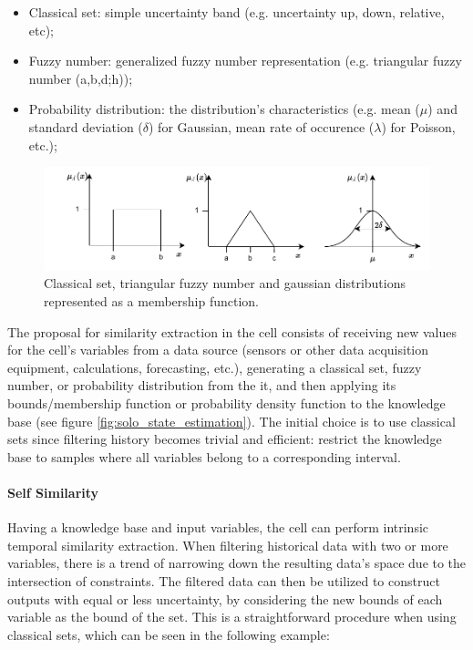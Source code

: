 \begin{itemize}
    \item Classical set: simple uncertainty band (e.g. uncertainty up, down, relative, etc);
    \item Fuzzy number: generalized fuzzy number representation \cite{Zhang2019} (e.g. triangular fuzzy number (a,b,d;h));
    \item Probability distribution: the distribution's characteristics (e.g. mean ($\mu$) and standard deviation ($\delta$) for Gaussian, mean rate of occurence ($\lambda$) for Poisson, etc.);
\end{itemize}

\begin{figure}[h!]
    \centering
    \includegraphics[width=15cm]{figures/chapter4/cell/classic_fuzzy_gaussian.pdf}
    \caption{Classical set, triangular fuzzy number and gaussian distributions represented as a membership function.}
    \label{fig:classicfuzzygaussian}
\end{figure}

The proposal for similarity extraction in the cell consists of receiving new values for the cell's variables from a data source (sensors or other data acquisition equipment, calculations, forecasting, etc.), generating a classical set, fuzzy number, or probability distribution from the it, and then applying its bounds/membership function or probability density function to the knowledge base (see figure \ref{fig:solo_state_estimation}). The initial choice is to use classical sets since filtering history becomes trivial and efficient: restrict the knowledge base to samples where all variables belong to a corresponding interval.

\paragraph{Self Similarity}

Having a knowledge base and input variables, the cell can perform intrinsic temporal similarity extraction. When filtering historical data with two or more variables, there is a trend of narrowing down the resulting data's space due to the intersection of constraints. The filtered data can then be utilized to construct outputs with equal or less uncertainty, by considering the new bounds of each variable as the bound of the set. This is a straightforward procedure when using classical sets, which can be seen in the following example:

